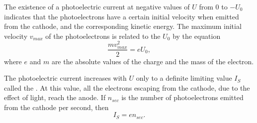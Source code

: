 The existence of a photoelectric current at negative values of $U$ from 0 to $- U_{0}$ indicates that the photoelectrons have a certain initial velocity when emitted from the cathode, and the corresponding kinetic energy. The maximum initial velocity $v_{max}$ of the photoelectrons is related to the  $U_{0}$ by the equation 
\begin{equation*}%
\frac{mv^{2}_{max}}{2} = eU_{0},
\end{equation*}
where $e$ and $m$ are the absolute values of the charge and the mass of the electron.

The photoelectric current increases with $U$ only to a definite
limiting value $I_{S}$ called the . At this value, all the electrons escaping from the cathode, due to the effect of light, reach the anode. If $n_{sec}$ is the number of photoelectrons emitted from the cathode per second, then
\begin{equation*}%
I_{S} = en_{sec}.
\end{equation*}


